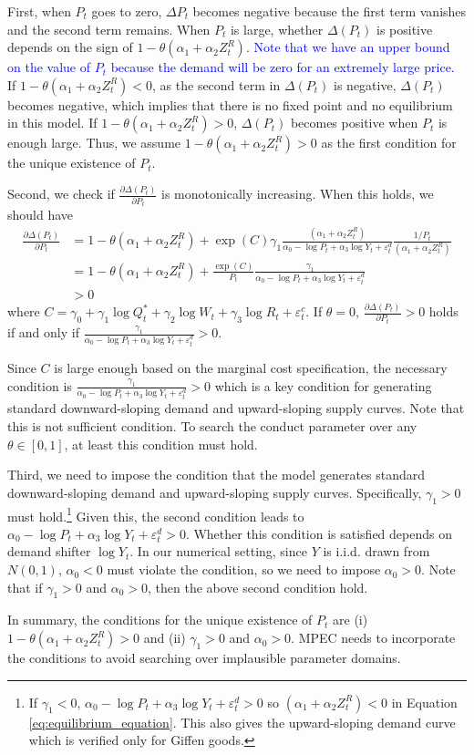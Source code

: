 \documentclass[11pt, a4paper]{article}
\begin{document}
First, when $P_t$ goes to zero, $\Delta P_t$ becomes negative because the first term vanishes and the second term remains.
When $P_t$ is large, whether $\Delta (P_t)$ is positive depends on the sign of $1 - \theta (\alpha_1 + \alpha_2 Z^{R}_{t})$. 
\textcolor{blue}{Note that we have an upper bound on the value of $P_t$ because the demand will be zero for an extremely large price.}
If $1 - \theta (\alpha_1 + \alpha_2 Z^{R}_{t})<0$, as the second term in $\Delta(P_t)$ is negative, $\Delta(P_t)$ becomes negative, which implies that there is no fixed point and no equilibrium in this model.
If $1 - \theta (\alpha_1 + \alpha_2 Z^{R}_{t})>0$, $\Delta(P_t)$ becomes positive when $P_{t}$ is enough large.
Thus, we assume $1 - \theta (\alpha_1 + \alpha_2 Z^{R}_{t})>0$ as the first condition for the unique existence of $P_{t}$. 

Second, we check if $\frac{\partial\Delta(P_t)}{\partial P_t}$ is monotonically increasing.
When this holds, we should have
\begin{align*}
    \frac{\partial\Delta(P_t)}{\partial P_t}&=1 - \theta (\alpha_1 + \alpha_2 Z^{R}_{t}) + \exp(C)\gamma_1 \frac{(\alpha_1 + \alpha_2 Z^{R}_{t})}{\alpha_0 - \log P_{t} + \alpha_3 \log Y_t + \varepsilon^{d}_{t}} \frac{1/P_{t}}{(\alpha_1 + \alpha_2 Z^{R}_{t})}\\
    &=1 - \theta (\alpha_1 + \alpha_2 Z^{R}_{t}) + \frac{\exp(C)}{P_t} \frac{\gamma_1}{\alpha_0 - \log P_{t} + \alpha_3 \log Y_t + \varepsilon^{d}_{t}}\\
    & >0
\end{align*}
where $C=\gamma_0 + \gamma_1 \log Q_t^* +  \gamma_2 \log W_{t} + \gamma_3 \log R_t + \varepsilon^{c}_{t}$. 
If $\theta=0$, $\frac{\partial \Delta (P_t)}{\partial P_t} >0$ holds if and only if $\frac{\gamma_1}{\alpha_0 - \log P_{t} + \alpha_3 \log Y_t + \varepsilon^{d}_{t}}>0$. 


Since $C$ is large enough based on the marginal cost specification, the necessary condition is $\frac{\gamma_1}{\alpha_0 - \log P_{t} + \alpha_3 \log Y_t + \varepsilon^{d}_{t}}>0$ which is a key condition for generating standard downward-sloping demand and upward-sloping supply curves. Note that this is not sufficient condition.
To search the conduct parameter over any $\theta\in [0,1]$, at least this condition must hold. 

Third, we need to impose the condition that the model generates standard downward-sloping demand and upward-sloping supply curves. Specifically, $\gamma_1>0$ must hold.\footnote{If $\gamma_1<0$, $\alpha_0 - \log P_{t} + \alpha_3 \log Y_t + \varepsilon^{d}_{t}>0$ so $(\alpha_1 + \alpha_2 Z^{R}_{t})<0$ in Equation \eqref{eq:equilibrium_equation}. This also gives the upward-sloping demand curve which is verified only for Giffen goods.} Given this, the second condition leads to $\alpha_0 - \log P_{t} + \alpha_3 \log Y_t + \varepsilon^{d}_{t}>0$. Whether this condition is satisfied depends on demand shifter $\log Y_t$. In our numerical setting, since $Y$ is i.i.d. drawn from $N(0,1)$, $\alpha_0<0$ must violate the condition, so we need to impose $\alpha_0>0$. Note that if $\gamma_1>0$ and $\alpha_0>0$, then the above second condition hold.

In summary, the conditions for the unique existence of $P_{t}$ are (i) $1 - \theta (\alpha_1 + \alpha_2 Z^{R}_{t})>0$ and (ii) $\gamma_1>0$ and $\alpha_0>0$. MPEC needs to incorporate the conditions to avoid searching over implausible parameter domains.
\end{document}
